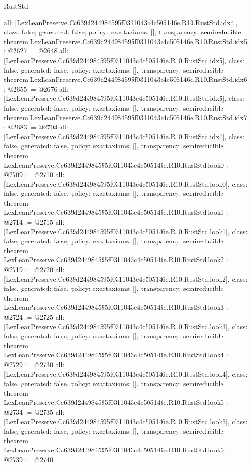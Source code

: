 \begin{lexlean}{RustStd}
\begin{coremodule}
{  all: [LexLeanPreserve.Cc639d244984595f0311043c4c505146e.R10.RustStd.idx4],
  class: false,
  generated: false,
  policy: exact{axioms: []},
  transparency: semireducible
}
theorem LexLeanPreserve.Cc639d244984595f0311043c4c505146e.R10.RustStd.idx5 : @2627 := @2648 {
  all: [LexLeanPreserve.Cc639d244984595f0311043c4c505146e.R10.RustStd.idx5],
  class: false,
  generated: false,
  policy: exact{axioms: []},
  transparency: semireducible
}
theorem LexLeanPreserve.Cc639d244984595f0311043c4c505146e.R10.RustStd.idx6 : @2655 := @2676 {
  all: [LexLeanPreserve.Cc639d244984595f0311043c4c505146e.R10.RustStd.idx6],
  class: false,
  generated: false,
  policy: exact{axioms: []},
  transparency: semireducible
}
theorem LexLeanPreserve.Cc639d244984595f0311043c4c505146e.R10.RustStd.idx7 : @2683 := @2704 {
  all: [LexLeanPreserve.Cc639d244984595f0311043c4c505146e.R10.RustStd.idx7],
  class: false,
  generated: false,
  policy: exact{axioms: []},
  transparency: semireducible
}
theorem LexLeanPreserve.Cc639d244984595f0311043c4c505146e.R10.RustStd.look0 : @2709 := @2710 {
  all: [LexLeanPreserve.Cc639d244984595f0311043c4c505146e.R10.RustStd.look0],
  class: false,
  generated: false,
  policy: exact{axioms: []},
  transparency: semireducible
}
theorem LexLeanPreserve.Cc639d244984595f0311043c4c505146e.R10.RustStd.look1 : @2714 := @2715 {
  all: [LexLeanPreserve.Cc639d244984595f0311043c4c505146e.R10.RustStd.look1],
  class: false,
  generated: false,
  policy: exact{axioms: []},
  transparency: semireducible
}
theorem LexLeanPreserve.Cc639d244984595f0311043c4c505146e.R10.RustStd.look2 : @2719 := @2720 {
  all: [LexLeanPreserve.Cc639d244984595f0311043c4c505146e.R10.RustStd.look2],
  class: false,
  generated: false,
  policy: exact{axioms: []},
  transparency: semireducible
}
theorem LexLeanPreserve.Cc639d244984595f0311043c4c505146e.R10.RustStd.look3 : @2724 := @2725 {
  all: [LexLeanPreserve.Cc639d244984595f0311043c4c505146e.R10.RustStd.look3],
  class: false,
  generated: false,
  policy: exact{axioms: []},
  transparency: semireducible
}
theorem LexLeanPreserve.Cc639d244984595f0311043c4c505146e.R10.RustStd.look4 : @2729 := @2730 {
  all: [LexLeanPreserve.Cc639d244984595f0311043c4c505146e.R10.RustStd.look4],
  class: false,
  generated: false,
  policy: exact{axioms: []},
  transparency: semireducible
}
theorem LexLeanPreserve.Cc639d244984595f0311043c4c505146e.R10.RustStd.look5 : @2734 := @2735 {
  all: [LexLeanPreserve.Cc639d244984595f0311043c4c505146e.R10.RustStd.look5],
  class: false,
  generated: false,
  policy: exact{axioms: []},
  transparency: semireducible
}
theorem LexLeanPreserve.Cc639d244984595f0311043c4c505146e.R10.RustStd.look6 : @2739 := @2740 {
}
\end{coremodule}
\end{lexlean}
